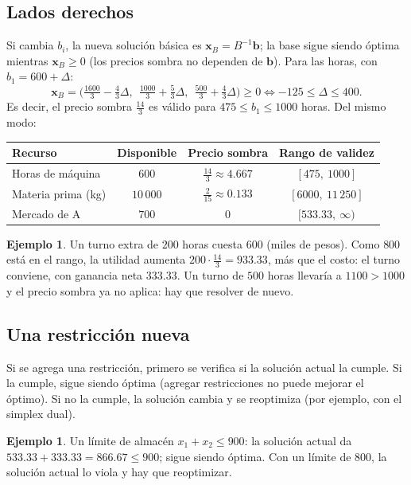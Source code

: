 \documentclass[a4paper,11pt]{article}
\theoremstyle{plain}
\theoremstyle{definition}
\newtheorem{ejemplo}[teorema]{Ejemplo}
\newcommand{\fr}[2]{\tfrac{#1}{#2}}
\begin{document}
\subsection{Lados derechos}
Si cambia $b_i$, la nueva solución básica es $\mathbf x_B=B^{-1}\mathbf b$; la base sigue siendo óptima mientras
$\mathbf x_B\ge0$ (los precios sombra no dependen de $\mathbf b$). Para las horas, con $b_1=600+\Delta$:
\[
\mathbf x_B=\Big(\fr{1600}3-\fr43\Delta,\ \ \fr{1000}3+\fr53\Delta,\ \ \fr{500}3+\fr43\Delta\Big)\ge0
\iff -125\le\Delta\le400.
\]
Es decir, el precio sombra $\fr{14}3$ es válido para $475\le b_1\le1000$ horas. Del mismo modo:
\begin{center}
\begin{tabular}{@{}lccc@{}}\toprule
Recurso & Disponible & Precio sombra & Rango de validez\\\midrule
Horas de máquina & $600$ & $\fr{14}3\approx4.667$ & $[475,\ 1000]$\\
Materia prima (kg) & $10\,000$ & $\fr2{15}\approx0.133$ & $[6000,\ 11\,250]$\\
Mercado de A & $700$ & $0$ & $[533.33,\ \infty)$\\
\bottomrule
\end{tabular}
\end{center}

\begin{ejemplo}
Un turno extra de $200$ horas cuesta $600$ (miles de pesos). Como $800$ está en el rango, la utilidad
aumenta $200\cdot\fr{14}3=933.33$, más que el costo: el turno conviene, con ganancia neta $333.33$. Un turno de
$500$ horas llevaría a $1100>1000$ y el precio sombra ya no aplica: hay que resolver de nuevo.
\end{ejemplo}

\subsection{Una restricción nueva}
Si se agrega una restricción, primero se verifica si la solución actual la cumple. Si la cumple, sigue
siendo óptima (agregar restricciones no puede mejorar el óptimo). Si no la cumple, la solución cambia y se
reoptimiza (por ejemplo, con el simplex dual).

\begin{ejemplo}
Un límite de almacén $x_1+x_2\le900$: la solución actual da $533.33+333.33=866.67\le900$; sigue siendo
óptima. Con un límite de $800$, la solución actual lo viola y hay que reoptimizar.
\end{ejemplo}
\end{document}
